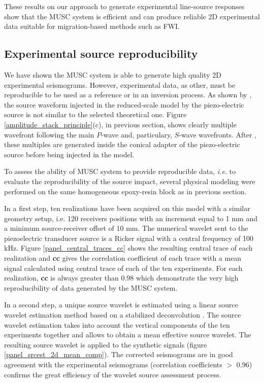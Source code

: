 \documentclass[manuscript,revised]{geophysics}
\begin{document}
\noindent These results on our approach to generate experimental line-source responses show that the MUSC system is efficient and can produce reliable 2D experimental data suitable for migration-based methods such as FWI.


\subsection{Experimental source reproducibility}

\noindent We have shown the MUSC system is able to generate high quality 2D experimental seismograms. However, experimental data, as other, must be reproducible to be used as a reference or in an inversion process. As shown by \citet{Bretaudeau_SSM_2011}, the source waveform injected in the reduced-scale model by the piezo-electric source is not similar to the selected theoretical one. Figure \ref{amplitude_stack_principle}(c), in previous section, shows clearly multiple wavefront following the main $P$-wave and, particulary, $S$-wave wavefronts. After \citet{Bretaudeau_SSM_2011}, these multiples are generated inside the conical adapter of the piezo-electric source before being injected in the model.

\noindent To assess the ability of MUSC system to provide reproducible data, \textit{i.e.} to evaluate the reproducibility of the source impact, several physical modeling were performed on the same homogeneous epoxy-resin block as in previous section. 

\noindent In a first step, ten realizations have been acquired on this model with a similar geometry setup, i.e. 120 receivers positions with an increment equal to 1 mm and a minimum source-receiver offset of 10 mm. The numerical wavelet sent to the piezoelectric transducer source is a Ricker signal with a central frequency of 100 kHz. Figure \ref{panel_central_traces_cc} shows the resulting central trace of each realization and \textbf{cc} gives the correlation coefficient of each trace with a mean signal calculated using central trace of each of the ten experiments. For each realization, \textbf{cc} is always greater than 0.98 which demonstrate the very high reproducibility of data generated by the MUSC system.

\noindent In a second step, a unique source wavelet is estimated using a linear source wavelet estimation method based on a stabilized deconvolution \citep{Pratt_FWI_1999}. The source wavelet estimation takes into account the vertical components of the ten experiments together and allows to obtain a mean effective source wavelet. The resulting source wavelet is applied to the synthetic signals (figure \ref{panel_srcest_2d_mean_comp}). The corrected seismograms are in good agreement with the experimental seismograms (correlation coefficients $\mathrm{>}$ 0.96) confirms the great efficiency of the wavelet source assessment process.  
\end{document}
